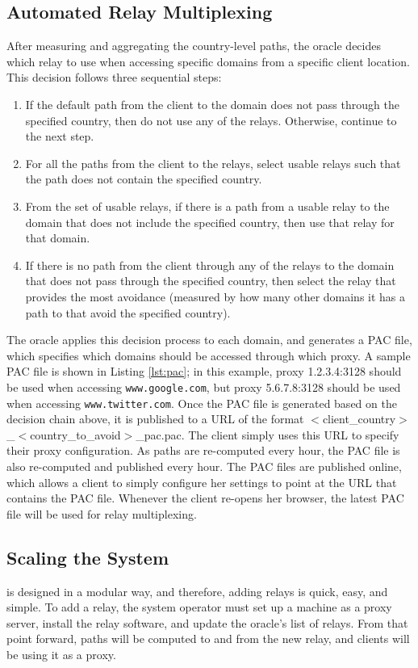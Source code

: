 \subsection{Automated Relay Multiplexing}
\label{multiplex}
After measuring and aggregating the country-level paths, the oracle decides 
which relay to use when accessing specific domains from a specific client 
location.  This decision follows three sequential steps:

\begin{enumerate}
\item If the default path from the client to the domain does not pass through 
the specified country, then do not use any of the relays. Otherwise, continue 
to the next step.
\item For all the paths from the client to the relays, select usable relays 
such that the path does not contain the specified country.
\item From the set of usable relays, if there is a path from a 
usable relay to the domain that does not include the specified country, then 
use that relay for that domain.
\item If there is no path from the client through any of the relays to the domain 
that does not pass through the specified country, then select the relay 
that provides the most avoidance (measured by how many other domains it has 
a path to that avoid the specified country).
\end{enumerate}

The oracle applies this decision process to each domain, and generates a PAC 
file, which specifies which domains should be accessed through which proxy.  A 
sample PAC file is shown in Listing \ref{lst:pac}; in this example, proxy 
1.2.3.4:3128 should be used when accessing {\tt www.google.com}, but proxy 
5.6.7.8:3128 should be used when accessing {\tt www.twitter.com}.  Once the PAC 
file is generated based on the decision chain above, it is published to a URL 
of the format $<$client\_country$>$\_$<$country\_to\_avoid$>$\_pac.pac.  The client 
simply uses this URL to specify their proxy configuration.  As paths are re-computed 
every hour, the PAC file is also re-computed and published every hour.  The PAC files 
are published online, which allows a client to simply configure her settings to 
point at the URL that contains the PAC file.  Whenever the client re-opens her 
browser, the latest PAC file will be used for relay multiplexing.

\subsection{Scaling the System}
\system{} is 
designed in a modular way, and therefore, adding relays is quick, easy, and 
simple.  To add a relay, the system operator must set up a machine as a proxy 
server, install the \system{} relay software, and update the oracle's list of 
relays.  From that point forward, paths will be computed to and from the new 
relay, and clients will be using it as a proxy.  

